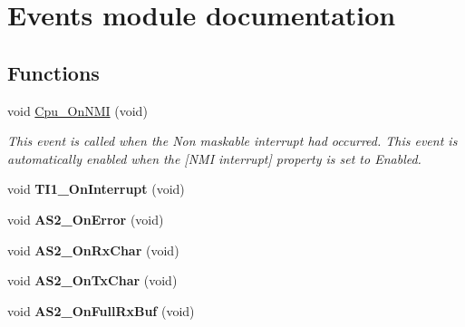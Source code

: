 \hypertarget{group___events__module}{}\section{Events module documentation}
\label{group___events__module}
\subsection*{Functions}
\begin{DoxyCompactItemize}
\item 
void \hyperlink{group___events__module_gabaee6afd9e7b4a0a57dc661945543d24}{Cpu\+\_\+\+On\+N\+MI} (void)\hypertarget{group___events__module_gabaee6afd9e7b4a0a57dc661945543d24}{}\label{group___events__module_gabaee6afd9e7b4a0a57dc661945543d24}

\begin{DoxyCompactList}\small\item\em This event is called when the Non maskable interrupt had occurred. This event is automatically enabled when the \mbox{[}N\+MI interrupt\mbox{]} property is set to \textquotesingle{}Enabled\textquotesingle{}. \end{DoxyCompactList}\item 
void {\bfseries T\+I1\+\_\+\+On\+Interrupt} (void)\hypertarget{group___events__module_ga01b566cf25a21b34152513dcb1321a11}{}\label{group___events__module_ga01b566cf25a21b34152513dcb1321a11}

\item 
void {\bfseries A\+S2\+\_\+\+On\+Error} (void)\hypertarget{group___events__module_ga0137853d241c656b6bf6653ebfc64cac}{}\label{group___events__module_ga0137853d241c656b6bf6653ebfc64cac}

\item 
void {\bfseries A\+S2\+\_\+\+On\+Rx\+Char} (void)\hypertarget{group___events__module_gadc4e66d9db0a63b063b37ad5a70a10be}{}\label{group___events__module_gadc4e66d9db0a63b063b37ad5a70a10be}

\item 
void {\bfseries A\+S2\+\_\+\+On\+Tx\+Char} (void)\hypertarget{group___events__module_ga745f5ad3a73381f935cc2ee2fec5c34f}{}\label{group___events__module_ga745f5ad3a73381f935cc2ee2fec5c34f}

\item 
void {\bfseries A\+S2\+\_\+\+On\+Full\+Rx\+Buf} (void)\hypertarget{group___events__module_gadc57756b6d8ed77d667f5568c9df0132}{}\label{group___events__module_gadc57756b6d8ed77d667f5568c9df0132}

\end{DoxyCompactItemize}
